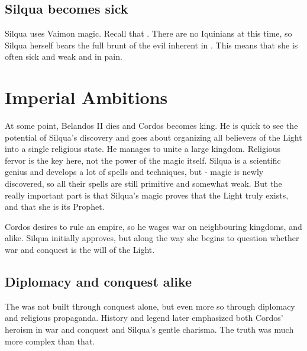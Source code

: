 \subsection{Silqua becomes sick}
Silqua uses Vaimon magic. 
Recall that . 
There are no Iquinians at this time, so Silqua herself bears the full brunt of the evil inherent in \Iquin. 
This means that she is often sick and weak and in pain. 














\section{Imperial Ambitions}
At some point, Belandos II dies and Cordos becomes king. He is quick to see the potential of Silqua's discovery and goes about organizing all believers of the Light into a single religious state. He manages to unite a large kingdom. Religious fervor is the key here, not the power of the magic itself. Silqua is a scientific genius and develops a lot of spells and techniques, but \iquin{}-\nieur{} magic is newly discovered, so all their spells are still primitive and somewhat weak. But the really important part is that Silqua's \iquin{} magic proves that the Light truly exists, and that she is its Prophet. 

Cordos desires to rule an empire, so he wages war on neighbouring kingdoms, \scathaese{} and \human{} alike. %
Silqua initially approves, but along the way she begins to question whether war and conquest is the will of the Light. 









\subsection{Diplomacy and conquest alike}
The \VaimonCaliphate was not built through conquest alone, but even more so through diplomacy and religious propaganda.
History and legend later emphasized both Cordos' heroism in war and conquest and Silqua's gentle charisma. 
The truth was much more complex than that. 

















